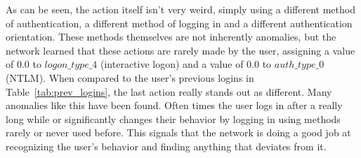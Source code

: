 As can be seen, the action itself isn't very weird, simply using a different method of authentication, a different method of logging in and a different authentication orientation. These methods themselves are not inherently anomalies, but the network learned that these actions are rarely made by the user, assigning a value of 0.0 to \(logon\_type\_4\) (interactive logon) and a value of 0.0 to \(auth\_type\_0\) (NTLM). When compared to the user's previous logins in Table~\ref{tab:prev_logins}, the last action really stands out as different. Many anomalies like this have been found. Often times the user logs in after a really long while or significantly changes their behavior by logging in using methods rarely or never used before. This signals that the network is doing a good job at recognizing the user's behavior and finding anything that deviates from it.